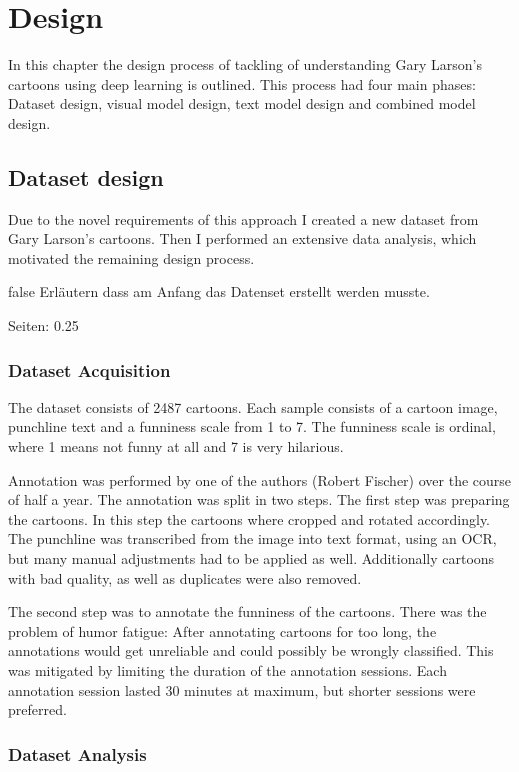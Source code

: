 \documentclass[draft,final,oneside]{vutinfth} %
\begin{document}
\chapter{Design} \label{design}

In this chapter the design process of tackling of understanding Gary Larson's cartoons using deep learning is outlined. This process had four main phases: Dataset design, visual model design, text model design and combined model design.

\section{Dataset design}

Due to the novel requirements of this approach I created a new dataset from Gary Larson's cartoons. Then I performed an extensive data analysis, which motivated the remaining design process.

\if false
Erläutern dass am Anfang das Datenset erstellt werden musste.

Seiten: 0.25
\fi

\subsection{Dataset Acquisition}
The dataset consists of 2487 cartoons. Each sample consists of a cartoon image, punchline text and a funniness scale from 1 to 7. The funniness scale is ordinal, where 1 means not funny at all and 7 is very hilarious.

Annotation was performed by one of the authors (Robert Fischer) over the course of half a year. The annotation was split in two steps. The first step was preparing the cartoons. In this step the cartoons where cropped and rotated accordingly. The punchline was transcribed from the image into text format, using an OCR, but many manual adjustments had to be applied as well. Additionally cartoons with bad quality, as well as duplicates were also removed.

The second step was to annotate the funniness of the cartoons. There was the problem of humor fatigue: After annotating cartoons for too long, the annotations would get unreliable and could possibly be wrongly classified. This was mitigated by limiting the duration of the annotation sessions. Each annotation session lasted 30 minutes at maximum, but shorter sessions were preferred. 

\subsection{Dataset Analysis}
\end{document}
